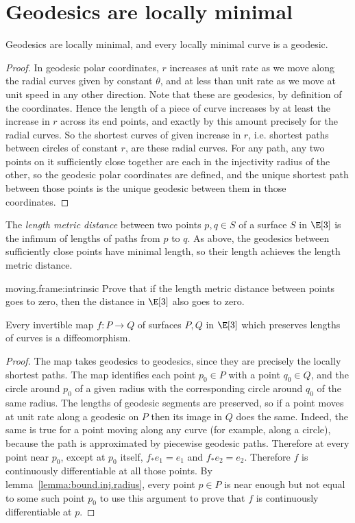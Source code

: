 \section{Geodesics are locally minimal}
\begin{theorem}
Geodesics are locally minimal, and every locally minimal curve is a geodesic.
\end{theorem}
\begin{proof}
In geodesic polar coordinates, \(r\) increases at unit rate as we move along the radial curves given by constant \(\theta\), and at less than unit rate as we move at unit speed in any other direction.
Note that these are geodesics, by definition of the coordinates.
Hence the length of a piece of curve increases by at least the increase in \(r\) across its end points, and exactly by this amount precisely for the radial curves.
So the shortest curves of given increase in \(r\), i.e. shortest paths between circles of constant \(r\), are these radial curves.
For any path, any two points on it sufficiently close together are each in the injectivity radius of the other, so the geodesic polar coordinates are defined, and the unique shortest path between those points is the unique geodesic between them in those coordinates.
\end{proof}

The \emph{length metric distance} between two points \(p, q \in S\) of a surface \(S\) in \(\E[3]\) is the infimum of lengths of paths from \(p\) to \(q\).
As above, the geodesics between sufficiently close points have minimal length, so their length achieves the length metric distance.
\begin{problem}{moving.frame:intrinsic}
Prove that if the length metric distance between points goes to zero, then the distance in \(\E[3]\) also goes to zero.
\end{problem}

\begin{corollary}\label{corollary:isometry.smooth}
Every invertible map \(f \colon P \to Q\) of surfaces \(P, Q\) in \(\E[3]\) which preserves lengths of curves is a diffeomorphism.  
\end{corollary}
\begin{proof}
The map takes geodesics to geodesics, since they are precisely the locally shortest paths.
The map identifies each point \(p_0 \in P\) with a point \(q_0 \in Q\), and the circle around \(p_0\) of a given radius with the corresponding circle around \(q_0\) of the same radius.
The lengths of geodesic segments are preserved, so if a point moves at unit rate along a geodesic on \(P\) then its image in \(Q\) does the same.
Indeed, the same is true for a point moving along any curve (for example, along a circle), because the path is approximated by piecewise geodesic paths.
Therefore at every point near \(p_0\), except at \(p_0\) itself, \(f_* e_1=e_1\) and \(f_* e_2=e_2\).
Therefore \(f\) is continuously differentiable at all those points.
By lemma~\vref{lemma:bound.inj.radius}, every point \(p \in P\) is near enough but not equal to some such point \(p_0\) to use this argument to prove that \(f\) is continuously differentiable at \(p\).
\end{proof}

